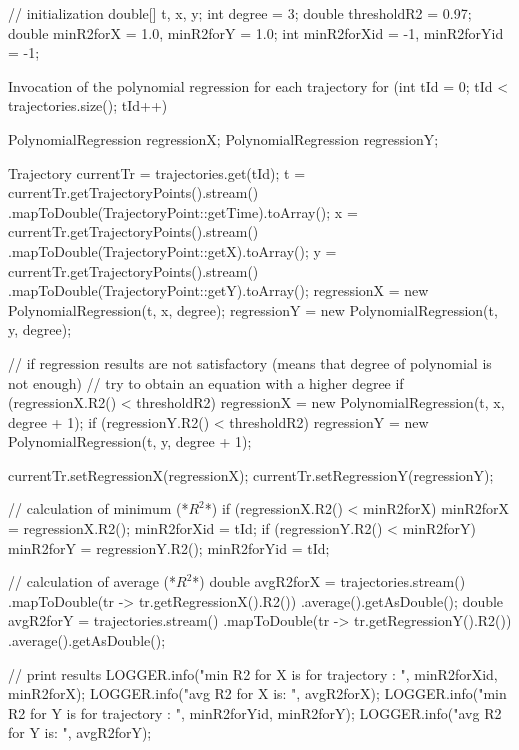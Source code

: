 // initialization
double[] t, x, y;
int degree = 3;
double thresholdR2 = 0.97;
double minR2forX = 1.0, minR2forY = 1.0;
int minR2forXid = -1, minR2forYid = -1;

Invocation of the polynomial regression for each trajectory
for (int tId = 0; tId < trajectories.size(); tId++) {
	PolynomialRegression regressionX;
	PolynomialRegression regressionY;
	
	Trajectory currentTr = trajectories.get(tId);
	t = currentTr.getTrajectoryPoints().stream()
		.mapToDouble(TrajectoryPoint::getTime).toArray();
	x = currentTr.getTrajectoryPoints().stream()
		.mapToDouble(TrajectoryPoint::getX).toArray();
	y = currentTr.getTrajectoryPoints().stream()
		.mapToDouble(TrajectoryPoint::getY).toArray();
	regressionX = new PolynomialRegression(t, x, degree);
	regressionY = new PolynomialRegression(t, y, degree);		

//	  if regression results are not satisfactory (means that degree of polynomial is not enough)
//    try to obtain an equation with a higher degree
	if (regressionX.R2() < thresholdR2)
		regressionX = new PolynomialRegression(t, x, degree + 1);
	if (regressionY.R2() < thresholdR2)
		regressionY = new PolynomialRegression(t, y, degree + 1);
		
	currentTr.setRegressionX(regressionX);
	currentTr.setRegressionY(regressionY);

//    calculation of minimum (*$R^2$*)
	if (regressionX.R2() < minR2forX) {
		minR2forX = regressionX.R2();
		minR2forXid = tId;
	}
	if (regressionY.R2() < minR2forY) {
		minR2forY = regressionY.R2();
		minR2forYid = tId;
	}
}

// calculation of average (*$R^2$*)
double avgR2forX = trajectories.stream()
	.mapToDouble(tr -> tr.getRegressionX().R2())
	.average().getAsDouble();
double avgR2forY = trajectories.stream()
	.mapToDouble(tr -> tr.getRegressionY().R2())
	.average().getAsDouble();

// print results
LOGGER.info("min R2 for X is for trajectory {}: {}", minR2forXid, minR2forX);
LOGGER.info("avg R2 for X is: {}", avgR2forX);
LOGGER.info("min R2 for Y is for trajectory {}: {}", minR2forYid, minR2forY);
LOGGER.info("avg R2 for Y is: {}", avgR2forY);